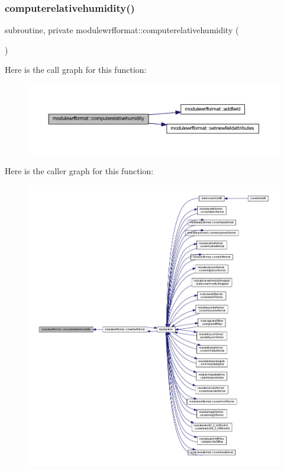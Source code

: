 \subsubsection{\texorpdfstring{computerelativehumidity()}{computerelativehumidity()}}
{\footnotesize\ttfamily subroutine, private modulewrfformat\+::computerelativehumidity (\begin{DoxyParamCaption}{ }\end{DoxyParamCaption})\hspace{0.3cm}{\ttfamily [private]}}

Here is the call graph for this function\+:\nopagebreak
\begin{figure}[H]
\begin{center}
\leavevmode
\includegraphics[width=350pt]{namespacemodulewrfformat_a9cb17629d782fef1666ac25cfe816e5e_cgraph}
\end{center}
\end{figure}
Here is the caller graph for this function\+:\nopagebreak
\begin{figure}[H]
\begin{center}
\leavevmode
\includegraphics[width=350pt]{namespacemodulewrfformat_a9cb17629d782fef1666ac25cfe816e5e_icgraph}
\end{center}
\end{figure}
\mbox{\label{namespacemodulewrfformat_a6471c4d2451b637d8c0fbc19ec57d7f7}} 
